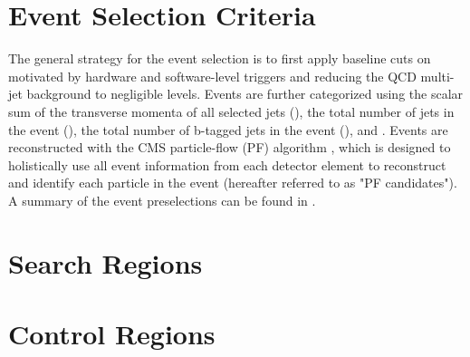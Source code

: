 \section{Event Selection Criteria}
The general strategy for the event selection is to first apply baseline cuts on motivated by hardware and software-level triggers  and reducing the QCD multi-jet background to negligible levels. Events are further categorized using the scalar sum of the transverse momenta \pt of all selected jets (\HT), the total number of jets in the event (\nj), the total number of b-tagged jets in the event (\nb), and \mttwo. Events are reconstructed with the CMS particle-flow (PF) algorithm , which is designed to holistically use all event information from each detector element to reconstruct and identify each particle in the event (hereafter referred to as "PF candidates"). A summary of the event preselections can be found in .

\section{Search Regions}


\section{Control Regions}


